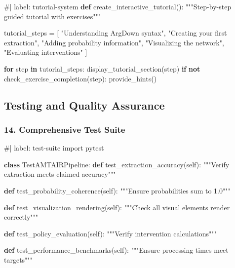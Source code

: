 \documentclass[
  11pt,
  letterpaper,
]{book}
\newenvironment{Shaded}{\begin{snugshade}}{\end{snugshade}}
\newcommand{\CommentTok}[1]{\textcolor[rgb]{0.37,0.37,0.37}{#1}}
\newcommand{\ControlFlowTok}[1]{\textcolor[rgb]{0.00,0.23,0.31}{\textbf{#1}}}
\newcommand{\ImportTok}[1]{\textcolor[rgb]{0.00,0.46,0.62}{#1}}
\newcommand{\KeywordTok}[1]{\textcolor[rgb]{0.00,0.23,0.31}{\textbf{#1}}}
\newcommand{\NormalTok}[1]{\textcolor[rgb]{0.00,0.23,0.31}{#1}}
\newcommand{\OperatorTok}[1]{\textcolor[rgb]{0.37,0.37,0.37}{#1}}
\newcommand{\StringTok}[1]{\textcolor[rgb]{0.13,0.47,0.30}{#1}}
\newcommand{\VariableTok}[1]{\textcolor[rgb]{0.07,0.07,0.07}{#1}}
\begin{document}
\begin{Shaded}
\begin{Highlighting}[]
\CommentTok{\#| label: tutorial{-}system}
\KeywordTok{def}\NormalTok{ create\_interactive\_tutorial():}
    \CommentTok{"""Step{-}by{-}step guided tutorial with exercises"""}
    
\NormalTok{    tutorial\_steps }\OperatorTok{=}\NormalTok{ [}
        \StringTok{"Understanding ArgDown syntax"}\NormalTok{,}
        \StringTok{"Creating your first extraction"}\NormalTok{,}
        \StringTok{"Adding probability information"}\NormalTok{,}
        \StringTok{"Visualizing the network"}\NormalTok{,}
        \StringTok{"Evaluating interventions"}
\NormalTok{    ]}
    
    \ControlFlowTok{for}\NormalTok{ step }\KeywordTok{in}\NormalTok{ tutorial\_steps:}
\NormalTok{        display\_tutorial\_section(step)}
        \ControlFlowTok{if} \KeywordTok{not}\NormalTok{ check\_exercise\_completion(step):}
\NormalTok{            provide\_hints()}
\end{Highlighting}
\end{Shaded}

\subsection{Testing and Quality
Assurance}\label{testing-and-quality-assurance}

\subsubsection{14. Comprehensive Test
Suite}\label{comprehensive-test-suite}

\begin{Shaded}
\begin{Highlighting}[]
\CommentTok{\#| label: test{-}suite}
\ImportTok{import}\NormalTok{ pytest}

\KeywordTok{class}\NormalTok{ TestAMTAIRPipeline:}
    \KeywordTok{def}\NormalTok{ test\_extraction\_accuracy(}\VariableTok{self}\NormalTok{):}
        \CommentTok{"""Verify extraction meets claimed accuracy"""}
        
    \KeywordTok{def}\NormalTok{ test\_probability\_coherence(}\VariableTok{self}\NormalTok{):}
        \CommentTok{"""Ensure probabilities sum to 1.0"""}
        
    \KeywordTok{def}\NormalTok{ test\_visualization\_rendering(}\VariableTok{self}\NormalTok{):}
        \CommentTok{"""Check all visual elements render correctly"""}
        
    \KeywordTok{def}\NormalTok{ test\_policy\_evaluation(}\VariableTok{self}\NormalTok{):}
        \CommentTok{"""Verify intervention calculations"""}
        
    \KeywordTok{def}\NormalTok{ test\_performance\_benchmarks(}\VariableTok{self}\NormalTok{):}
        \CommentTok{"""Ensure processing times meet targets"""}
\end{Highlighting}
\end{Shaded}
\end{document}
